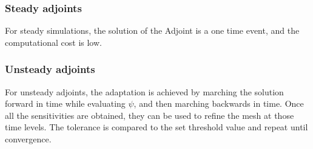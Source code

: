 \subsubsection{Steady adjoints}

For steady simulations, the solution of the Adjoint is a one time event, and the computational cost is low.

\subsubsection{Unsteady adjoints}
For unsteady adjoints, the adaptation is achieved by marching the solution forward in time while evaluating $\psi$, and then marching backwards in time. Once all the sensitivities are obtained, they can be used to refine the mesh at those time levels. The tolerance is compared to the set threshold value and repeat until convergence.\par


